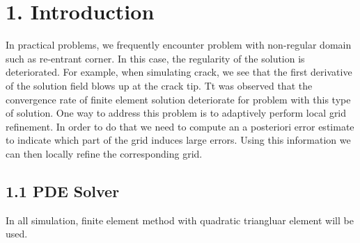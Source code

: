 \documentclass[11pt, letterpaper, hidelinks]{article}
\theoremstyle{definition}
\begin{document}
\section{1. Introduction}
In practical problems, we frequently encounter problem with non-regular domain such as re-entrant corner. In this case, the regularity of the solution is deteriorated. For example, when simulating crack, we see that the first derivative of the solution field blows up at the crack tip. Tt was observed that the convergence rate of finite element solution deteriorate for problem with this type of solution. One way to address this problem is to adaptively perform local grid refinement. In order to do that we need to compute an a posteriori error estimate to indicate which part of the grid induces large errors. Using this information we can then locally refine the corresponding grid.

\subsection{1.1 PDE Solver}
In all simulation, finite element method with quadratic triangluar element will be used.
\end{document}
